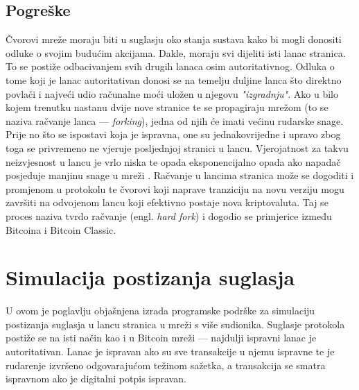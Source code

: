 \documentclass[utf8, zavrsni]{fer}
\begin{document}
\section{Pogreške}
Čvorovi mreže moraju biti u suglasju oko stanja sustava kako bi mogli donositi odluke o svojim budućim akcijama. Dakle, moraju svi dijeliti isti lanac stranica. To se postiže odbacivanjem svih drugih lanaca osim autoritativnog. Odluka o tome koji je lanac autoritativan donosi se na temelju duljine lanca što direktno povlači i najveći udio računalne moći uložen u njegovu \textit{"izgradnju"}. Ako u bilo kojem trenutku nastanu dvije nove stranice te se propagiraju mrežom (to se naziva račvanje lanca --- \textit{forking}), jedna od njih će imati većinu rudarske snage. Prije no što se ispostavi koja je ispravna, one su jednakovrijedne i upravo zbog toga se privremeno ne vjeruje posljednjoj stranici u lancu. Vjerojatnost za takvu neizvjesnost u lancu je vrlo niska te opada eksponencijalno opada ako napadač posjeduje manjinu snage u mreži \cite{nakamoto2012bitcoin}. Račvanje u lancima stranica može se dogoditi i promjenom u protokolu te čvorovi koji naprave tranziciju na novu verziju mogu završiti na odvojenom lancu koji efektivno postaje nova kriptovaluta. Taj se proces naziva tvrdo račvanje (engl. \textit{hard fork}) i dogodio se primjerice između Bitcoina i Bitcoin Classic.

\chapter{Simulacija postizanja suglasja}

U ovom je poglavlju objašnjena izrada programske podrške za simulaciju postizanja suglasja u lancu stranica u mreži s više sudionika. Suglasje protokola postiže se na isti način kao i u Bitcoin mreži --- najdulji ispravni lanac je autoritativan. Lanac je ispravan ako su sve transakcije u njemu ispravne te je rudarenje izvršeno odgovarajućom težinom sažetka, a transakcija se smatra ispravnom ako je digitalni potpis ispravan.
\end{document}
